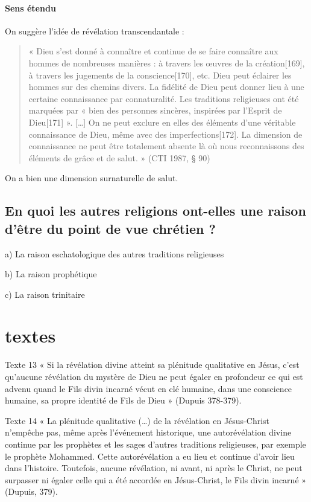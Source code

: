 \paragraph{Sens étendu}
On suggère l'idée de révélation transcendantale : 
\begin{quote}
    « Dieu s’est donné à connaître et continue de se faire connaître aux hommes de nombreuses manières : à travers les œuvres de la création[169], à travers les jugements de la conscience[170], etc. Dieu peut éclairer les hommes sur des chemins divers. La fidélité de Dieu peut donner lieu à une certaine connaissance par connaturalité. Les traditions religieuses ont été marquées par « bien des personnes sincères, inspirées par l’Esprit de Dieu[171] ». […] On ne peut exclure en elles des éléments d’une véritable connaissance de Dieu, même avec des imperfections[172]. La dimension de connaissance ne peut être totalement absente là où nous reconnaissons des éléments de grâce et de salut. » (CTI 1987, § 90)
\end{quote}

On a bien une dimension surnaturelle de salut. 

\subsection{En quoi les autres religions ont-elles une raison d’être du point de vue chrétien ?}  

a) La raison eschatologique des autres traditions religieuses


b) La raison prophétique 


c) La raison trinitaire  


\section{textes}

Texte 13 « Si la révélation divine atteint sa plénitude qualitative en Jésus, c’est qu’aucune révélation du mystère de Dieu ne peut égaler en profondeur ce qui est advenu quand le Fils divin incarné vécut en clé humaine, dans une conscience humaine, sa propre identité de Fils de Dieu » (Dupuis 378-379).



Texte 14  « La plénitude qualitative (…) de la révélation en Jésus-Christ n’empêche pas, même après l’événement historique, une autorévélation divine continue par les prophètes et les sages d’autres traditions religieuses, par exemple le prophète Mohammed. Cette autorévélation a eu lieu et continue d’avoir lieu dans l’histoire. Toutefois, aucune révélation, ni avant, ni après le Christ, ne peut surpasser ni égaler celle qui a été accordée en Jésus-Christ, le Fils divin incarné » (Dupuis, 379).



